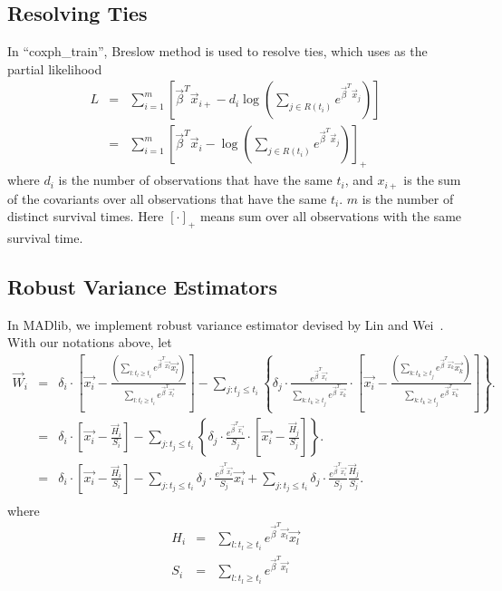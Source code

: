 \subsection{Resolving Ties}
In ``coxph\_train'', Breslow method is used to resolve ties, which uses
as the partial likelihood~\cite{hosmer2011applied}
\begin{eqnarray}
  L &=& \sum_{i=1}^{m}\left[ \vec{\beta}^{T} \vec{x}_{i+} -
    d_i \log\left( \sum_{j \in R(t_i)} e^{\vec{\beta}^T
        \vec{x}_j}\right) \right]\\
  &=& \sum_{i=1}^{m}\left[ \vec{\beta}^{T} \vec{x}_i - \log\left( \sum_{j \in R(t_i)} e^{\vec{\beta}^T
        \vec{x}_j}\right)\right]_{+}
\end{eqnarray}
where $d_i$ is the number of observations that have the same $t_i$,
and $x_{i+}$ is the sum of the covariants over all observations that
have the same $t_i$. $m$ is the number of distinct survival
times. Here $[\cdot]_{+}$ means sum over all observations with the
same survival time.

\subsection{Robust Variance Estimators}
In MADlib, we implement robust variance estimator devised by Lin and Wei~\cite{lin1989robust}.
With our notations above, let
\begin{eqnarray*}
    \vec{W}_{i}
    &=& \delta_i \cdot \left[ \vec{x_i} - \frac{\left( \sum_{l: t_l \ge t_i} e^{\vec{\beta}^T \vec{x_l}} \vec{x_l} \right)}{\sum_{l: t_l \ge t_i} e^{\vec{\beta}^T \vec{x_l}}} \right]
    - \sum_{j: t_j \le t_i} \left\{ \delta_j \cdot \frac{e^{\vec{\beta}^T \vec{x_i}}}{\sum_{k: t_k \ge t_j} e^{\vec{\beta}^T \vec{x_k}}}
    \cdot \left[ \vec{x_i} - \frac{\left( \sum_{k: t_k \ge t_j} e^{\vec{\beta}^T \vec{x_k}} \vec{x_k} \right)}{\sum_{k: t_k \ge t_j} e^{\vec{\beta}^T \vec{x_k}}} \right] \right\}.\\
    &=& \delta_i \cdot \left[ \vec{x_i} - \frac{\vec{H}_i}{S_i} \right]
    - \sum_{j: t_j \le t_i} \left\{ \delta_j \cdot \frac{e^{\vec{\beta}^T \vec{x_i}}}{S_j}
    \cdot \left[ \vec{x_i} - \frac{\vec{H}_j}{S_j} \right] \right\}.\\
    &=& \delta_i \cdot \left[ \vec{x_i} - \frac{\vec{H}_i}{S_i} \right]
    - \sum_{j: t_j \le t_i} \delta_j \cdot \frac{e^{\vec{\beta}^T \vec{x_i}}}{S_j} \vec{x_i}
    + \sum_{j: t_j \le t_i} \delta_j \cdot \frac{e^{\vec{\beta}^T \vec{x_i}}}{S_j} \frac{\vec{H}_j}{S_j}.\\
\end{eqnarray*}
where
\begin{eqnarray*}
H_i &=&  \sum_{l: t_l \ge t_i} e^{\vec{\beta}^T \vec{x_l}} \vec{x_l}\\
S_i &=& \sum_{l: t_l \ge t_i} e^{\vec{\beta}^T \vec{x_l}}
\end{eqnarray*}

